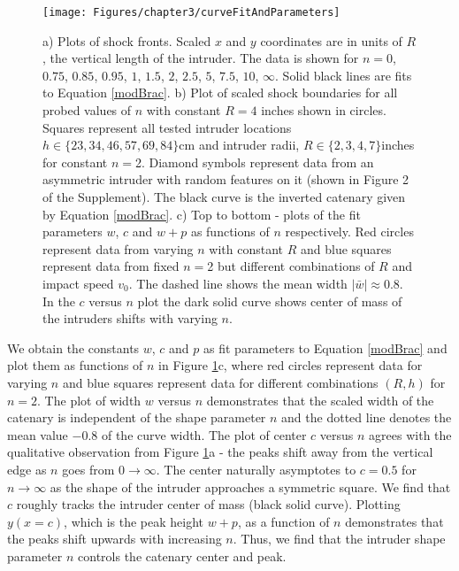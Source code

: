 \begin{figure}
	\texttt{[image: Figures/chapter3/curveFitAndParameters]}
	\caption{ a) Plots of shock fronts. Scaled $x$ and $y$ coordinates are in units of $R$, the vertical length of the intruder. The data is shown for $n=0$, $0.75$, $0.85$, $0.95$, $1$, $1.5$, $2$, $2.5$, $5$, $7.5$, $10$, $\infty$. Solid black lines are fits to Equation \ref{modBrac}. b) Plot of scaled shock boundaries for all probed values of $n$ with constant $R=4$ inches shown in circles. Squares represent all tested intruder locations $h\in\{ 23, 34, 46, 57, 69, 84 \}$cm and intruder radii, $R\in\{2,3,4,7\}$inches for constant $n=$2. Diamond symbols represent data from an asymmetric intruder with random features on it (shown in Figure 2 of the Supplement). The black curve is the inverted catenary given by Equation \ref{modBrac}. c) Top to bottom - plots of the fit parameters $w$, $c$ and $w+p$ as functions of $n$ respectively. Red circles represent data from varying $n$ with constant $R$ and blue squares represent data from fixed $n=$2 but different combinations of $R$ and impact speed $v_{0}$. The dashed line shows the mean width $|\bar{w}| \approx$0.8. In the $c$ versus $n$ plot the dark solid curve shows center of mass of the intruders shifts with varying $n$. }
	\label{curveFitPanel}
\end{figure}

We obtain the constants $w$, $c$ and $p$ as fit parameters to Equation \ref{modBrac} and plot them as functions of $n$ in Figure \ref{curveFitPanel}c, where red circles represent data for varying $n$ and blue squares represent data for different combinations $(R,h)$ for $n=2$. The plot of width $w$ versus $n$ demonstrates that the scaled width of the catenary is independent of the shape parameter $n$ and the dotted line denotes the mean value $-0.8$ of the curve width. The plot of center $c$ versus $n$ agrees with the qualitative observation from Figure \ref{curveFitPanel}a - the peaks shift away from the vertical edge as $n$ goes from $0\rightarrow\infty$.  The center naturally asymptotes to $c=0.5$ for $n\rightarrow\infty$ as the shape of the intruder approaches a symmetric square. We find that $c$ roughly tracks the intruder center of mass (black solid curve).  Plotting $y(x=c)$, which is the peak height $w+p$, as a function of $n$ demonstrates that the peaks shift upwards with increasing $n$. Thus, we find that the intruder shape parameter $n$ controls the catenary center and peak.

